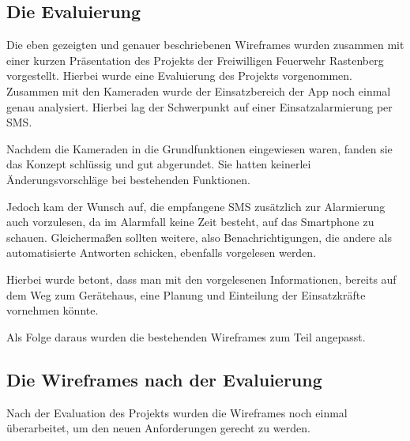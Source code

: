 \subsection{Die Evaluierung}
Die eben gezeigten und genauer beschriebenen Wireframes wurden zusammen mit einer kurzen Pr\"asentation des Projekts der Freiwilligen Feuerwehr Rastenberg vorgestellt.
Hierbei wurde eine Evaluierung des Projekts vorgenommen. Zusammen mit den Kameraden wurde der Einsatzbereich der App noch einmal genau analysiert. Hierbei lag der Schwerpunkt auf einer Einsatzalarmierung per SMS. 

Nachdem die Kameraden in die Grundfunktionen eingewiesen waren, fanden sie das Konzept schl\"ussig und gut abgerundet. Sie hatten keinerlei \"Anderungsvorschl\"age bei bestehenden Funktionen. 

Jedoch kam der Wunsch auf, die empfangene SMS zus\"atzlich zur Alarmierung auch vorzulesen, da im Alarmfall keine Zeit besteht, auf das Smartphone zu schauen. Gleicherma\ss{}en sollten weitere, also Benachrichtigungen, die andere als automatisierte Antworten schicken, ebenfalls vorgelesen werden.

Hierbei wurde betont, dass man mit den vorgelesenen Informationen, bereits auf dem Weg zum Ger\"atehaus, eine Planung und Einteilung der Einsatzkr\"afte vornehmen k\"onnte.

Als Folge daraus wurden die bestehenden Wireframes zum Teil angepasst.

\subsection{Die Wireframes nach der Evaluierung}
Nach der Evaluation des Projekts wurden die Wireframes noch einmal \"uberarbeitet, um den neuen Anforderungen gerecht zu werden.

